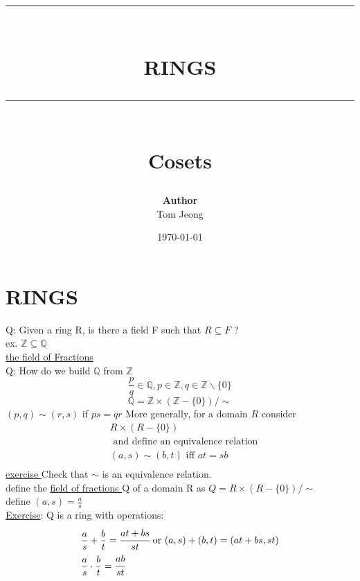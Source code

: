 \documentclass{article}
\newcommand{\HRule}[1]{\rule{\linewidth}{#1}}
\begin{document}

\title{ \normalsize \textsc{}
		\\ [2.0cm]
		\HRule{1.5pt} \\
		\LARGE \textbf{\uppercase{RINGS}}
		\HRule{2.0pt} \\ [0.6cm] \LARGE{Cosets}
		}

\date{\today}
\author{\textbf{Author} \\ 
		Tom Jeong
        }

\maketitle
\newpage

\tableofcontents
\newpage

\section{RINGS}
Q: Given a ring R, is there a field F such that $R \subseteq F$ ?\\
ex. $\mathbb{Z} \subseteq \mathbb{Q}$ \\ 
\underline{the field of Fractions } \\ 
Q: How do we build $\mathbb{Q}$ from $\mathbb{Z}$
$$\frac{p}{q} \in \mathbb{Q}, p \in \mathbb{Z}, q \in \mathbb{Z} \backslash \{0\} $$
$$\mathbb{Q} = \mathbb{Z} \times (\mathbb{Z} - \{0\}) / \sim$$
$(p, q) \sim (r,s)$ if $ps =qr$
More generally, for a domain $R$ consider \begin{align*}
    & R \times (R - \{0\}) \\ 
    &  \text{ and define an equivalence relation} \\ 
    &(a, s) \sim (b,t) \text{ iff } at = sb \\ 
\end{align*}
\underline{exercise } Check that $\sim$ is an equivalence relation. 
\\ 
define the \underline{field of fractions } Q of a domain R as $Q = R \times ( R - \{0\} ) / \sim $ \\ 
define $(a,s) = \frac{a}{s}$
\\ 
\underline{Exercise}: Q is a ring with operations: 
\begin{align*}
    &\frac{a}{s} + \frac{b}{t} = \cfrac{at + bs}{st} \text{ or } (a,s) + (b,t) = (at + bs, st)\\
    &\frac{a}{s} \cdot \frac{b}{t} = \cfrac{ab}{st}
\end{align*}
\end{document}
